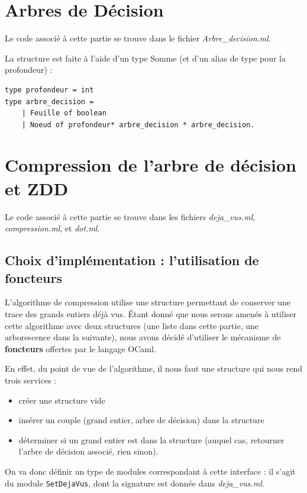 \documentclass[12pt,a4paper]{article}
\begin{document}
\section{Arbres de Décision}
Le code associé à cette partie se trouve dans le fichier \textit{Arbre\_decision.ml}.

La structure est faite à l'aide d'un type Somme (et d'un alias de type pour la profondeur) :

\medskip

\begin{lstlisting}
type profondeur = int
type arbre_decision = 
	| Feuille of boolean 
	| Noeud of profondeur* arbre_decision * arbre_decision.
\end{lstlisting}
\medskip


\section{Compression de l’arbre de décision et ZDD}

Le code associé à cette partie se trouve dans les fichiers \textit{deja\_vus.ml}, \textit{compression.ml}, et \textit{dot.ml}.

\subsection{Choix d'implémentation : l'utilisation de foncteurs}

L'algorithme de compression utilise une structure permettant de conserver une trace des grands entiers déjà vus. Étant donné que nous serons amenés à utiliser cette algorithme avec deux structures (une liste dans cette partie, une arborescence dans la suivante), nous avons décidé d'utiliser le mécanisme de \textbf{foncteurs} offertes par le langage OCaml.

En effet, du point de vue de l'algorithme, il nous faut une structure qui nous rend trois services : 

\begin{itemize}
\item créer une structure vide
\item insérer un couple (grand entier, arbre de décision) dans la structure
\item déterminer si un grand entier est dans la structure (auquel cas, retourner l'arbre de décision associé, rien sinon).
\end{itemize}

On va donc définir un type de modules correspondant à cette interface : il s'agit du module \texttt{SetDejaVus}, dont la signature est donnée dans \textit{deja\_vus.ml}.
\end{document}

